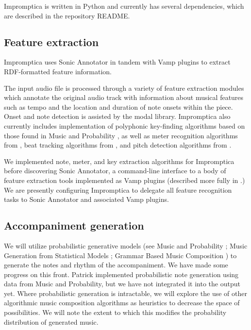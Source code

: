 \documentclass[11pt,conference,letterpaper]{IEEEtran}
\begin{document}
Impromptica is written in Python and currently has several dependencies, which are described in the repository README.

\subsection{Feature extraction}

Impromptica uses Sonic Annotator in tandem with Vamp plugins to extract RDF-formatted feature information.

The input audio file is processed through a variety of feature extraction modules which annotate the original audio track with information about musical features such as tempo and the location and duration of note onsets within the piece. Onset and note detection is assisted by the modal library. Impromptica also currently includes implementation of polyphonic key-finding algorithms based on those found in Music and Probability \cite{temperly2007mprob}, as well as meter recognition algorithms from \cite{klapuri2006analysis}, beat tracking algorithms from \cite{ellis2007beat}, and pitch detection algorithms from \cite{TODO}.

We implemented note, meter, and key extraction algorithms for Impromptica before discovering Sonic Annotator, a command-line interface to a body of feature extraction tools implemented as Vamp plugins (described more fully in \cite{cannam2010sonic}.) We are presently configuring Impromptica to delegate all feature recognition tasks to Sonic Annotator and associated Vamp plugins.

\subsection{Accompaniment generation}

We will utilize probabilistic generative models (see Music and Probability \cite{temperly2007mprob}; Music Generation from Statistical Models \cite{conklin2003music}; Grammar Based Music Composition \cite{mccormack1996grammar}) to generate the notes and rhythm of the accompaniment. We have made some progress on this front. Patrick implemented probabilistic note generation using data from Music and Probability, but we have not integrated it into the output yet. Where probabilistic generation is intractable, we will explore the use of other algorithmic music composition algorithms as heuristics to decrease the space of possibilities. We will note the extent to which this modifies the probability distribution of generated music.
\end{document}
